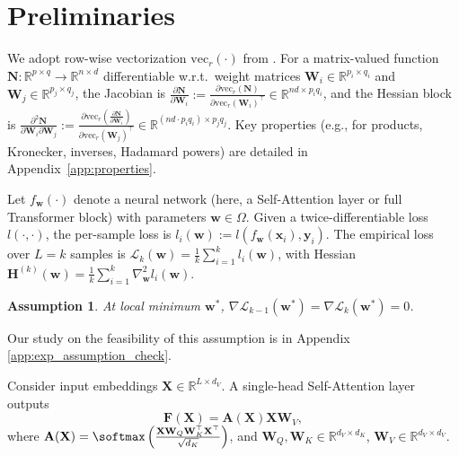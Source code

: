 \documentclass{article}
\newtheorem{assumption}{Assumption}
\begin{document}
\section{Preliminaries}\label{sec:prelim}

We adopt row-wise vectorization \(\mathrm{vec}_r(\cdot)\) from \cite{ormaniec2024attentionhessian, noci2022signalpropagationtransformerstheoretical}. For a matrix-valued function \(\mathbf{N}: \mathbb{R}^{p \times q} \to \mathbb{R}^{n \times d}\) differentiable w.r.t.\ weight matrices \(\mathbf{W}_i \in \mathbb{R}^{p_i \times q_i}\) and \(\mathbf{W}_j \in \mathbb{R}^{p_j \times q_j}\), the Jacobian is \(\frac{\partial \mathbf{N}}{\partial \mathbf{W}_i} := \frac{\partial \mathrm{vec}_r(\mathbf{N})}{\partial \mathrm{vec}_r(\mathbf{W}_i)^\top} \in \mathbb{R}^{n d \times p_i q_i}\), and the Hessian block is \(\frac{\partial^2 \mathbf{N}}{\partial \mathbf{W}_i \partial \mathbf{W}_j} := \frac{\partial \mathrm{vec}_r(\frac{\partial \mathbf{N}}{\partial \mathbf{W}_i})}{\partial \mathrm{vec}_r(\mathbf{W}_j)^\top} \in \mathbb{R}^{(n d \cdot p_i q_i) \times p_j q_j}\). Key properties (e.g., for products, Kronecker, inverses, Hadamard powers) are detailed in Appendix~\ref{app:properties}.

Let \(f_{\mathbf{w}}(\cdot)\) denote a neural network (here, a Self-Attention layer or full Transformer block) with parameters \(\mathbf{w} \in \Omega\). Given a twice-differentiable loss \(l(\cdot, \cdot)\), the per-sample loss is \(l_i(\mathbf{w}) := l(f_{\mathbf{w}}(\mathbf{x}_i), \mathbf{y}_i)\). The empirical loss over \( L = k\) samples is \(\mathcal{L}_k(\mathbf{w}) = \frac{1}{k} \sum_{i=1}^k l_i(\mathbf{w})\), with Hessian \(\mathbf{H}^{(k)}(\mathbf{w}) = \frac{1}{k} \sum_{i=1}^k \nabla^2_{\mathbf{w}} l_i(\mathbf{w})\).

\begin{assumption} \label{as:zero_grad}
At local minimum \(\mathbf{w}^*\), \(\nabla \mathcal{L}_{k-1}(\mathbf{w}^*) = \nabla \mathcal{L}_k(\mathbf{w}^*) = 0\).
\end{assumption}
Our study on the feasibility of this assumption is in Appendix \ref{app:exp_assumption_check}.

Consider input embeddings \(\mathbf{X} \in \mathbb{R}^{L \times d_V}\). A single-head Self-Attention layer outputs
\begin{equation} \label{eq:self_attention}
    \mathbf{F}(\mathbf{X}) = \mathbf{A}(\mathbf{X}) \mathbf{X} \mathbf{W}_V,
\end{equation}
where \(\mathbf{A}(\mathbf{X}) = \softmax\left( \frac{\mathbf{X} \mathbf{W}_Q \mathbf{W}_K^\top \mathbf{X}^\top}{\sqrt{d_K}} \right)\), and \(\mathbf{W}_Q, \mathbf{W}_K \in \mathbb{R}^{d_V \times d_K}\), \(\mathbf{W}_V \in \mathbb{R}^{d_V \times d_V}\). 
\end{document}
